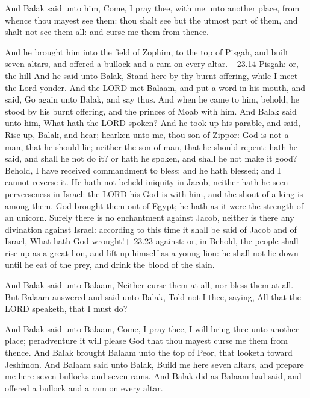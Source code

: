  And Balak said unto him, Come, I pray thee, with me unto
another place, from whence thou mayest see them: thou shalt see but the
utmost part of them, and shalt not see them all: and curse me them from
thence.

 And he brought him into the field of Zophim, to the top
of Pisgah, and built seven altars, and offered a bullock and a ram on
every altar.+ 23.14 Pisgah: or, the hill  And he said unto
Balak, Stand here by thy burnt offering, while I meet the Lord yonder.
 And the LORD met Balaam, and put a word in his mouth, and
said, Go again unto Balak, and say thus.  And when he came
to him, behold, he stood by his burnt offering, and the princes of Moab
with him. And Balak said unto him, What hath the LORD spoken?
 And he took up his parable, and said, Rise up, Balak, and
hear; hearken unto me, thou son of Zippor:  God is not a
man, that he should lie; neither the son of man, that he should repent:
hath he said, and shall he not do it? or hath he spoken, and shall he
not make it good?  Behold, I have received commandment to
bless: and he hath blessed; and I cannot reverse it.  He
hath not beheld iniquity in Jacob, neither hath he seen perverseness in
Israel: the LORD his God is with him, and the shout of a king is among
them.  God brought them out of Egypt; he hath as it were
the strength of an unicorn.  Surely there is no enchantment
against Jacob, neither is there any divination against Israel: according
to this time it shall be said of Jacob and of Israel, What hath God
wrought!+ 23.23 against: or, in  Behold, the people shall
rise up as a great lion, and lift up himself as a young lion: he shall
not lie down until he eat of the prey, and drink the blood of the slain.

 And Balak said unto Balaam, Neither curse them at all,
nor bless them at all.  But Balaam answered and said unto
Balak, Told not I thee, saying, All that the LORD speaketh, that I must
do?

 And Balak said unto Balaam, Come, I pray thee, I will
bring thee unto another place; peradventure it will please God that thou
mayest curse me them from thence.  And Balak brought Balaam
unto the top of Peor, that looketh toward Jeshimon.  And
Balaam said unto Balak, Build me here seven altars, and prepare me here
seven bullocks and seven rams.  And Balak did as Balaam had
said, and offered a bullock and a ram on every altar.

